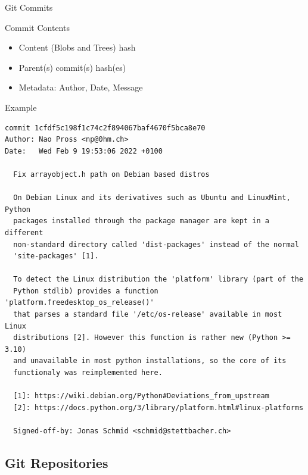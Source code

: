 \documentclass[xetex, handout]{beamer}
\begin{document}
\begin{frame}[fragile]{Git Commits}
  \begin{block}{Commit Contents}
    \begin{itemize}
      \item Content (Blobs and Trees) hash 
      \item Parent(s) commit(s) hash(es)
      \item Metadata: Author, Date, Message
    \end{itemize}
  \end{block}
  \begin{exampleblock}{Example}
  \centering\scriptsize
\begin{verbatim}
commit 1cfdf5c198f1c74c2f894067baf4670f5bca8e70
Author: Nao Pross <np@0hm.ch>
Date:   Wed Feb 9 19:53:06 2022 +0100

  Fix arrayobject.h path on Debian based distros
  
  On Debian Linux and its derivatives such as Ubuntu and LinuxMint, Python
  packages installed through the package manager are kept in a different
  non-standard directory called 'dist-packages' instead of the normal
  'site-packages' [1].
  
  To detect the Linux distribution the 'platform' library (part of the
  Python stdlib) provides a function 'platform.freedesktop_os_release()'
  that parses a standard file '/etc/os-release' available in most Linux
  distributions [2]. However this function is rather new (Python >= 3.10)
  and unavailable in most python installations, so the core of its
  functionaly was reimplemented here.
  
  [1]: https://wiki.debian.org/Python#Deviations_from_upstream
  [2]: https://docs.python.org/3/library/platform.html#linux-platforms
  
  Signed-off-by: Jonas Schmid <schmid@stettbacher.ch>
\end{verbatim}
  \end{exampleblock}
\end{frame}

\subsection{Git Repositories}
\end{document}
